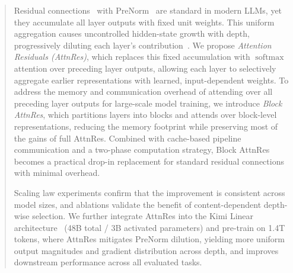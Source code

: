 \begin{abstract}
    Residual connections~\citep{he2015resnet} with PreNorm~\citep{xiong2020layer} are standard in modern LLMs, yet they accumulate all layer outputs with fixed unit weights. This uniform aggregation causes uncontrolled hidden-state growth with depth, progressively diluting each layer's contribution~\citep{li2026siamesenorm}.
    We propose \emph{Attention Residuals (AttnRes)}, which replaces this fixed accumulation with $\operatorname{softmax}$ attention over preceding layer outputs, allowing each layer to selectively aggregate earlier representations with learned, input-dependent weights.
    To address the memory and communication overhead of attending over all preceding layer outputs for large-scale model training, we introduce \emph{Block AttnRes}, which partitions layers into blocks and attends over block-level representations, reducing the memory footprint while preserving most of the gains of full AttnRes. Combined with cache-based pipeline communication and a two-phase computation strategy, Block AttnRes becomes a practical drop-in replacement for standard residual connections with minimal overhead.

    Scaling law experiments confirm that the improvement is consistent across model sizes, and ablations validate the benefit of content-dependent depth-wise selection.
    We further integrate AttnRes into the Kimi Linear architecture~\citep{zhang2025kimi} (48B total / 3B activated parameters) and pre-train on 1.4T tokens, where AttnRes mitigates PreNorm dilution, yielding more uniform output magnitudes and gradient distribution across depth, and improves downstream performance across all evaluated tasks.
\end{abstract}
\vspace{-20pt}


